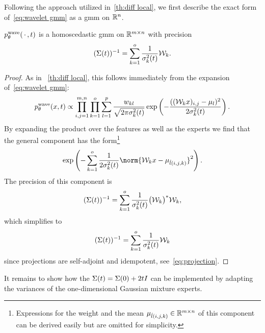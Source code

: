 Following the approach utilized in~\cref{th:diff local}, we first describe the exact form of~\eqref{eq:wavelet gmm} as a \gls{gmm} on \( \mathbb{R}^n \).
\begin{theorem}
	\( p^{\mathrm{wave}}_\theta(\,\cdot\,, t) \) is a homoscedastic \gls{gmm} on \( \mathbb{R}^{m\times n} \) with precision
	\begin{equation}
		(\Sigma(t))^{-1} =  \sum_{k=\num{1}}^o \frac{1}{\sigma_k^{\num{2}}(t)} \mathcal{W}_k.
	\end{equation}
	\label{prf:wavelet gmm}
\end{theorem}
\begin{proof}
	As in ~\cref{th:diff local}, this follows immediately from the expansion of~\cref{eq:wavelet gmm}:
	\begin{equation}
		p^{\mathrm{wave}}_\theta(x, t) \propto \prod_{i,j=\num{1}}^{m,n} \prod_{k=\num{1}}^o \sum_{l=\num{1}}^{p} \frac{w_{kl}}{\sqrt{\num{2}\pi\sigma_k^{\num{2}}(t)}} \exp\left(-\frac{((\mathcal{W}_k x)_{i, j} - \mu_l)^{\num{2}}}{\num{2}\sigma_k^{\num{2}}(t)}\right).
		\label{eq:conv gmm}
	\end{equation}
	By expanding the product over the features as well as the experts we find that the general component has the form\footnote{%
		Expressions for the weight and the mean \( \mu_{\hat{l}(i, j, k)} \in \mathbb{R}^{m\times n} \) of this component can be derived easily but are omitted for simplicity.
	}
	\begin{equation}
		\exp\left(-\sum_{k=\num{1}}^\NumExperts \frac{\num{1}}{\num{2}\sigma_k^{\num{2}}(t)}\norm{\mathcal{W}_k x - \mu_{\hat{l}(i, j, k)}}^{\num{2}}\right).
		\label{eq:expanded}
	\end{equation}
	The precision of this component is
	\begin{equation}
		(\Sigma(t))^{-1} = \sum_{k=\num{1}}^o \frac{\num{1}}{\sigma_k^{\num{2}}(t)} \bigl(\mathcal{W}_k \bigr)^\ast \mathcal{W}_k,
		\label{eq:prec rn}
	\end{equation}
	which simplifies to
	\begin{equation}
		(\Sigma(t))^{-1} = \sum_{k=\num{1}}^o \frac{\num{1}}{\sigma_k^{\num{2}}(t)} \mathcal{W}_k
		\label{eq:wavelet prec}
	\end{equation}
	since projections are self-adjoint and idempotent, see~\eqref{eq:projection}.
\end{proof}
It remains to show how the \( \Sigma(t) = \Sigma(\num{0}) + \num{2}tI \) can be implemented by adapting the variances of the one-dimensional Gaussian mixture experts.
